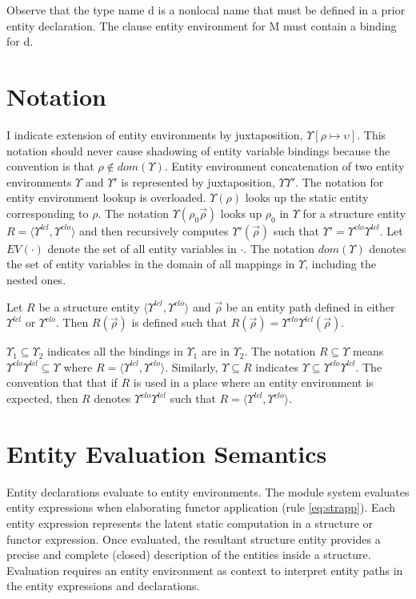 Observe that the type name d is a nonlocal name that must be defined in a prior entity declaration. The clause entity environment for M must contain a binding for d.  

\section{Notation}\label{sec:entitycalc-notation}
I indicate extension of entity environments by juxtaposition, $\Upsilon[\rho\mapsto\upsilon]$. This notation should never cause shadowing of entity variable bindings because the convention is that $\rho\notin dom(\Upsilon)$. 
Entity environment concatenation of two entity environments $\Upsilon$ and $\Upsilon'$ is represented by juxtaposition, $\Upsilon\Upsilon'$. The notation for entity environment lookup is overloaded. $\Upsilon(\rho)$ looks up the static entity corresponding to $\rho$. The notation $\Upsilon(\rho_0\vec{\rho})$ looks up $\rho_0$ in $\Upsilon$ for a structure entity $R=\langle \Upsilon^{lcl},\Upsilon^{clo} \rangle$ and then recursively computes $\Upsilon'(\vec{\rho})$ such that $\Upsilon' = \Upsilon^{clo}\Upsilon^{lcl}$. Let $EV(\cdot)$ denote the set of all entity variables in $\cdot$. The notation $dom(\Upsilon)$ denotes the set of entity variables in the domain of all mappings in $\Upsilon$, including the nested ones. 

Let $R$ be a structure entity $\langle\Upsilon^{lcl},\Upsilon^{clo}\rangle$ and $\vec{\rho}$ be an entity path defined in either $\Upsilon^{lcl}$ or $\Upsilon^{clo}$. Then $R(\vec{\rho})$ is defined such that $R(\vec{\rho}) = \Upsilon^{clo}\Upsilon^{lcl}(\vec{\rho})$. 

$\Upsilon_1 \subseteq \Upsilon_2$ indicates all the bindings in
$\Upsilon_1$ are in $\Upsilon_2$. The notation $R \subseteq \Upsilon$
means $\Upsilon^{clo}\Upsilon^{lcl}\subseteq \Upsilon$ where $R=\langle
\Upsilon^{lcl}, \Upsilon^{clo}\rangle$. Similarly, $\Upsilon\subseteq R$
indicates $\Upsilon \subseteq \Upsilon^{clo}\Upsilon^{lcl}$. The convention that that if $R$ is used in a place where an entity environment is expected, then $R$ denotes $\Upsilon^{clo}\Upsilon^{lcl}$ such that $R = \langle \Upsilon^{lcl}, \Upsilon^{clo} \rangle$. 

\section{Entity Evaluation Semantics}


Entity declarations evaluate to entity environments. The module system evaluates entity expressions when elaborating functor application (rule \ref{eq:strapp}). Each entity expression represents the latent static computation in a structure or functor expression. Once evaluated, the resultant structure entity provides a precise and complete (closed) description of the entities inside a structure. Evaluation requires an entity environment as context to interpret entity paths in the entity expressions and declarations. 

